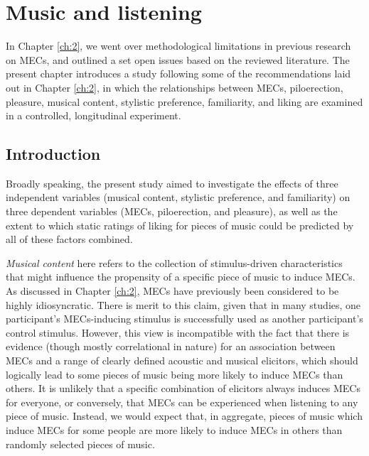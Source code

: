 
\chapter{Music and listening}
\label{ch:3}

In Chapter \ref{ch:2}, we went over methodological limitations in previous research on MECs, and outlined a set open issues based on the reviewed literature. The present chapter introduces a study following some of the recommendations laid out in Chapter \ref{ch:2}, in which the relationships between MECs, piloerection, pleasure, musical content, stylistic preference, familiarity, and liking are examined in a controlled, longitudinal experiment.

\section{Introduction}

Broadly speaking, the present study aimed to investigate the effects of three independent variables (musical content, stylistic preference, and familiarity) on three dependent variables (MECs, piloerection, and pleasure), as well as the extent to which static ratings of liking for pieces of music could be predicted by all of these factors combined.

\emph{Musical content} here refers to the collection of stimulus-driven characteristics that might influence the propensity of a specific piece of music to induce MECs. As discussed in Chapter \ref{ch:2}, MECs have previously been considered to be highly idiosyncratic. There is merit to this claim, given that in many studies, one participant's MECs-inducing stimulus is successfully used as another participant's control stimulus. However, this view is incompatible with the fact that there is evidence (though mostly correlational in nature) for an association between MECs and a range of clearly defined acoustic and musical elicitors, which should logically lead to some pieces of music being more likely to induce MECs than others. It is unlikely that a specific combination of elicitors always induces MECs for everyone, or conversely, that MECs can be experienced when listening to any piece of music. Instead, we would expect that, in aggregate, pieces of music which induce MECs for some people are more likely to induce MECs in others than randomly selected pieces of music.

